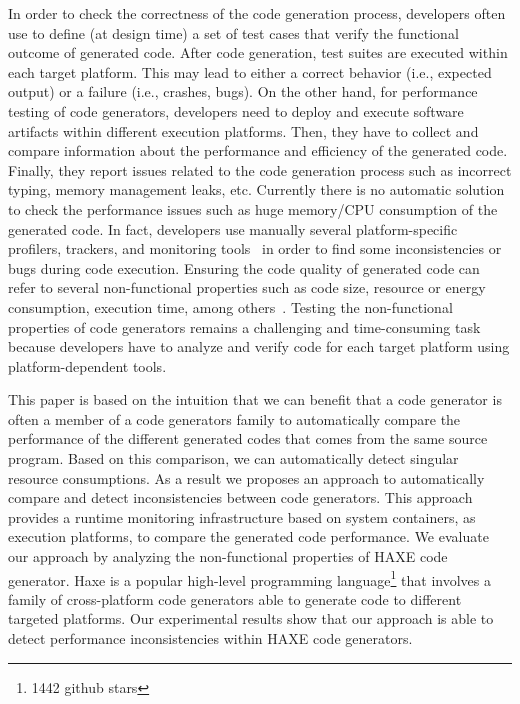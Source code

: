 In order to check the correctness of the code generation process, developers often use to define (at design time) a set of test cases that verify the functional outcome of generated code. After code generation, test suites are executed within each target platform. This may lead to either a correct behavior (i.e., expected output) or a failure (i.e., crashes, bugs). On the other hand, for performance testing of code generators, developers need to deploy and execute software artifacts within different execution platforms. Then, they have to collect and compare information about the performance and efficiency of the generated code. Finally, they report issues related to the code generation process such as incorrect typing, memory management leaks, etc. Currently there is no automatic solution to check the performance issues such as huge memory/CPU consumption of the generated code. In fact, developers use manually several platform-specific profilers, trackers, and monitoring tools~\cite{guana2014chaintracker,delgado2004taxonomy} in order to find some inconsistencies or bugs during code execution. Ensuring the code quality of generated code can refer to several non-functional properties such as code size, resource or energy consumption, execution time, among others~\cite{pan2006fast}. %
Testing the non-functional properties of code generators remains a challenging and time-consuming task because developers have to analyze and verify code for each target platform using platform-dependent tools.

This paper is based on the intuition that we can benefit that a code generator is often a member of a code generators family to automatically compare the  performance of the different generated codes that comes from the same source program. Based on this comparison, we can automatically detect singular resource consumptions. As a result we proposes an approach to automatically compare and detect inconsistencies between code generators. This approach provides a runtime monitoring infrastructure based on system containers, as execution platforms, to compare the generated code performance. %
We evaluate our approach by analyzing the non-functional properties of HAXE code generator. Haxe is a popular high-level programming language\footnote{1442 github stars} that involves a family of cross-platform code generators able to generate code to different targeted platforms. Our experimental results show that our approach is able to detect performance inconsistencies within HAXE code generators.


